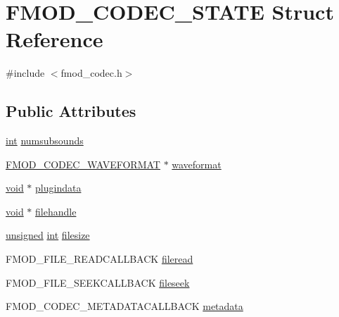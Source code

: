 \hypertarget{struct_f_m_o_d___c_o_d_e_c___s_t_a_t_e}{\section{F\-M\-O\-D\-\_\-\-C\-O\-D\-E\-C\-\_\-\-S\-T\-A\-T\-E Struct Reference}
\label{struct_f_m_o_d___c_o_d_e_c___s_t_a_t_e}
}


{\ttfamily \#include $<$fmod\-\_\-codec.\-h$>$}

\subsection*{Public Attributes}
\begin{DoxyCompactItemize}
\item 
\hyperlink{wglew_8h_a500a82aecba06f4550f6849b8099ca21}{int} \hyperlink{struct_f_m_o_d___c_o_d_e_c___s_t_a_t_e_af9c17a02d9b967fa0ececf991a654dfd}{numsubsounds}
\item 
\hyperlink{struct_f_m_o_d___c_o_d_e_c___w_a_v_e_f_o_r_m_a_t}{F\-M\-O\-D\-\_\-\-C\-O\-D\-E\-C\-\_\-\-W\-A\-V\-E\-F\-O\-R\-M\-A\-T} $\ast$ \hyperlink{struct_f_m_o_d___c_o_d_e_c___s_t_a_t_e_a785115172e17e38c3baf764e8f67b962}{waveformat}
\item 
\hyperlink{wglew_8h_aeea6e3dfae3acf232096f57d2d57f084}{void} $\ast$ \hyperlink{struct_f_m_o_d___c_o_d_e_c___s_t_a_t_e_a8201fa8b60e1cf571ac0d66e678b3928}{plugindata}
\item 
\hyperlink{wglew_8h_aeea6e3dfae3acf232096f57d2d57f084}{void} $\ast$ \hyperlink{struct_f_m_o_d___c_o_d_e_c___s_t_a_t_e_af70df892eb7bc2cb3b29854536fad747}{filehandle}
\item 
\hyperlink{_free_image_8h_a425076c7067a1b5166e2cc530e914814}{unsigned} \hyperlink{wglew_8h_a500a82aecba06f4550f6849b8099ca21}{int} \hyperlink{struct_f_m_o_d___c_o_d_e_c___s_t_a_t_e_af314546d98e746687bfeaae8a59f792c}{filesize}
\item 
F\-M\-O\-D\-\_\-\-F\-I\-L\-E\-\_\-\-R\-E\-A\-D\-C\-A\-L\-L\-B\-A\-C\-K \hyperlink{struct_f_m_o_d___c_o_d_e_c___s_t_a_t_e_a5ae058ad0c24eb2766b30a56e63dc6d1}{fileread}
\item 
F\-M\-O\-D\-\_\-\-F\-I\-L\-E\-\_\-\-S\-E\-E\-K\-C\-A\-L\-L\-B\-A\-C\-K \hyperlink{struct_f_m_o_d___c_o_d_e_c___s_t_a_t_e_a687641e4351497085141f91e70831928}{fileseek}
\item 
F\-M\-O\-D\-\_\-\-C\-O\-D\-E\-C\-\_\-\-M\-E\-T\-A\-D\-A\-T\-A\-C\-A\-L\-L\-B\-A\-C\-K \hyperlink{struct_f_m_o_d___c_o_d_e_c___s_t_a_t_e_ac567cbf774e3f9dbbc8a3c4dd351ddd4}{metadata}
\end{DoxyCompactItemize}



